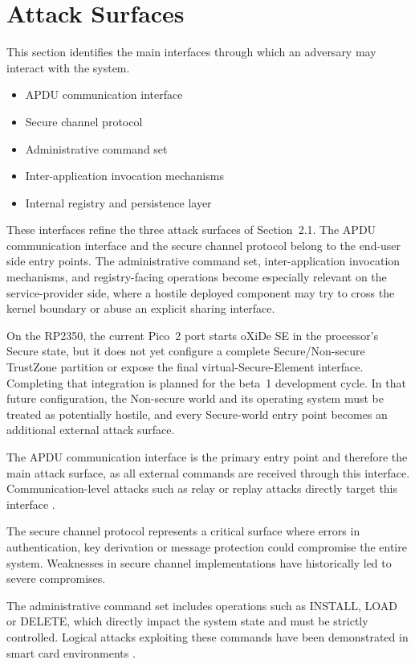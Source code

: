 \section{Attack Surfaces}

This section identifies the main interfaces through which an adversary may interact with the system.

\begin{itemize}
\item APDU communication interface
\item Secure channel protocol
\item Administrative command set
\item Inter-application invocation mechanisms
\item Internal registry and persistence layer
\end{itemize}

These interfaces refine the three attack surfaces of Section~2.1. The APDU
communication interface and the secure channel protocol belong to the end-user
side entry points. The administrative command set, inter-application
invocation mechanisms, and registry-facing operations become especially
relevant on the service-provider side, where a hostile deployed component may
try to cross the kernel boundary or abuse an explicit sharing interface.

On the RP2350, the current Pico~2 port starts oXiDe SE in the processor's Secure
state, but it does not yet configure a complete Secure/Non-secure TrustZone
partition or expose the final virtual-Secure-Element interface. Completing that
integration is planned for the beta~1 development cycle. In that future
configuration, the Non-secure world and its operating system must be treated as
potentially hostile, and every Secure-world entry point becomes an additional
external attack surface.

The APDU communication interface is the primary entry point and therefore the
main attack surface, as all external commands are received through this
interface. Communication-level attacks such as relay or replay attacks directly
target this interface \cite{roland2012relay}.

The secure channel protocol represents a critical surface where errors in
authentication, key derivation or message protection could compromise the
entire system. Weaknesses in secure channel implementations have historically
led to severe compromises.

The administrative command set includes operations such as INSTALL, LOAD or
DELETE, which directly impact the system state and must be strictly controlled.
Logical attacks exploiting these commands have been demonstrated in smart card
environments \cite{barbu2010javacard, lanet2012handson}.

